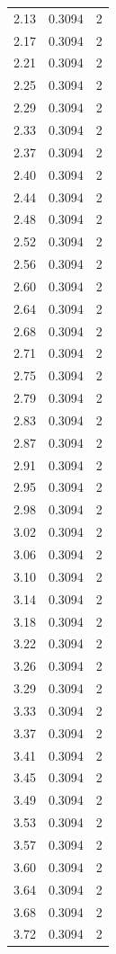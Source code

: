 \begin{longtable}{lrr}
  2.13 & 0.3094 & 2 \\
  2.17 & 0.3094 & 2 \\
  2.21 & 0.3094 & 2 \\
  2.25 & 0.3094 & 2 \\
  2.29 & 0.3094 & 2 \\
  2.33 & 0.3094 & 2 \\
  2.37 & 0.3094 & 2 \\
  2.40 & 0.3094 & 2 \\
  2.44 & 0.3094 & 2 \\
  2.48 & 0.3094 & 2 \\
  2.52 & 0.3094 & 2 \\
  2.56 & 0.3094 & 2 \\
  2.60 & 0.3094 & 2 \\
  2.64 & 0.3094 & 2 \\
  2.68 & 0.3094 & 2 \\
  2.71 & 0.3094 & 2 \\
  2.75 & 0.3094 & 2 \\
  2.79 & 0.3094 & 2 \\
  2.83 & 0.3094 & 2 \\
  2.87 & 0.3094 & 2 \\
  2.91 & 0.3094 & 2 \\
  2.95 & 0.3094 & 2 \\
  2.98 & 0.3094 & 2 \\
  3.02 & 0.3094 & 2 \\
  3.06 & 0.3094 & 2 \\
  3.10 & 0.3094 & 2 \\
  3.14 & 0.3094 & 2 \\
  3.18 & 0.3094 & 2 \\
  3.22 & 0.3094 & 2 \\
  3.26 & 0.3094 & 2 \\
  3.29 & 0.3094 & 2 \\
  3.33 & 0.3094 & 2 \\
  3.37 & 0.3094 & 2 \\
  3.41 & 0.3094 & 2 \\
  3.45 & 0.3094 & 2 \\
  3.49 & 0.3094 & 2 \\
  3.53 & 0.3094 & 2 \\
  3.57 & 0.3094 & 2 \\
  3.60 & 0.3094 & 2 \\
  3.64 & 0.3094 & 2 \\
  3.68 & 0.3094 & 2 \\
  3.72 & 0.3094 & 2 \\

\end{longtable}
